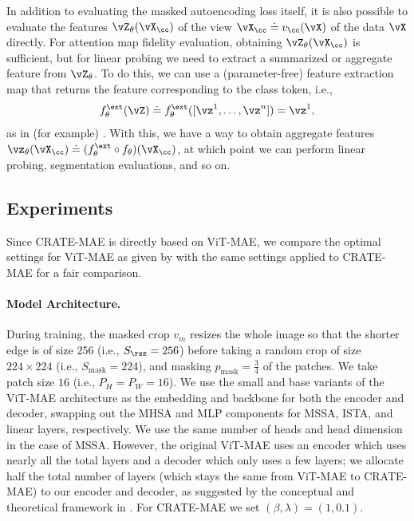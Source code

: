 \documentclass[../../book-main.tex]{subfiles}
\begin{document}
In addition to evaluating the masked autoencoding loss itself, it is
also possible to evaluate the features \(\vZ_{\theta}(\vX_{\cc})\) of
the view \(\vX_{\cc} \doteq v_{\cc}(\vX)\) of the data \(\vX\)
directly. For attention map fidelity evaluation, obtaining
\(\vZ_{\theta}(\vX_{\cc})\) is sufficient, but for linear probing we
need to extract a summarized or aggregate feature from
\(\vZ_{\theta}\). To do this, we can use a (parameter-free) feature
extraction map that returns the feature corresponding to the class token, i.e.,
\begin{equation}
f_{\theta}^{\ext}(\vZ) \doteq f_{\theta}^{\ext}([\vz^{1}, \dots,
\vz^{n}]) = \vz^{1},
\end{equation}
as in (for example)
.
With this, we have a way to obtain aggregate features
\(\vz_{\theta}(\vX_{\cc}) \doteq (f_{\theta}^{\ext} \circ
f_{\theta})(\vX_{\cc})\), at which point we can perform linear
probing, segmentation evaluations, and so on.

\subsection{Experiments}\label{sub:image_completion_experiments}

Since CRATE-MAE is directly based on ViT-MAE, we compare the optimal
settings for ViT-MAE as given by \citep{he2022masked} with the same
settings applied to CRATE-MAE for a fair comparison.

\paragraph{Model Architecture.} During training, the masked crop
\(v_{m}\) resizes the whole image so that the shorter edge is of size
\(256\) (i.e., \(S_{\rsz} = 256\)) before taking a random crop of
size \(224 \times 224\) (i.e., \(S_{\mathrm{mask}} = 224\)), and
masking \(p_{\mathrm{mask}} = \frac{3}{4}\) of the patches. We take
patch size \(16\) (i.e., \(P_{H} = P_{W} = 16\)). We use the small
and base variants of the ViT-MAE architecture as the embedding and
backbone for both the encoder and decoder, swapping out the MHSA and
MLP components for MSSA, ISTA, and linear layers, respectively. We
use the same number of heads and head dimension in the case of MSSA.
However, the original ViT-MAE uses an encoder which uses nearly all
the total layers and a decoder which only uses a few layers; we
allocate half the total number of layers (which stays the same from
ViT-MAE to CRATE-MAE) to our encoder and decoder, as suggested by the
conceptual and theoretical framework in
. For
CRATE-MAE we set \((\beta, \lambda) = (1, 0.1)\).
\end{document}
